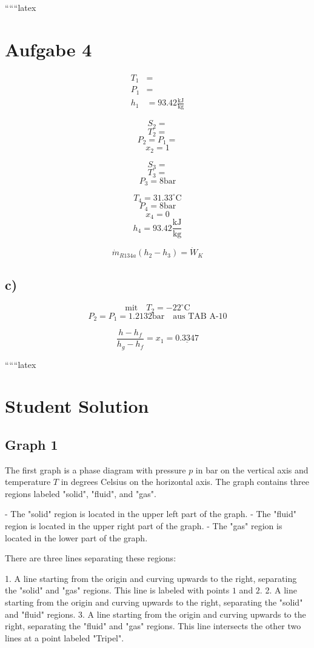 
``````latex


\section*{Aufgabe 4}

\begin{align*}
T_1 &= \\
P_1 &= \\
h_1 &= 93.42 \frac{\text{kJ}}{\text{kg}}
\end{align*}

\[
S_2 = 
\]
\[
T_2 = 
\]
\[
P_2 = P_1 = 
\]
\[
x_2 = 1
\]

\[
S_3 = 
\]
\[
T_3 = 
\]
\[
P_3 = 8 \text{bar}
\]

\[
T_4 = 31.33^\circ \text{C}
\]
\[
P_4 = 8 \text{bar}
\]
\[
x_4 = 0
\]
\[
h_4 = 93.42 \frac{\text{kJ}}{\text{kg}}
\]

\[
\dot{m}_{R134a} (h_2 - h_3) = \dot{W}_K
\]

\subsection*{c)}
\[
\text{mit} \quad T_2 = -22^\circ \text{C}
\]
\[
P_2 = P_1 = 1.2132 \text{bar} \quad \text{aus TAB A-10}
\]

\[
\frac{h - h_f}{h_g - h_f} = x_1 = \underline{0.3347}
\]

``````latex


\section*{Student Solution}

\subsection*{Graph 1}

The first graph is a phase diagram with pressure \( p \) in bar on the vertical axis and temperature \( T \) in degrees Celsius on the horizontal axis. The graph contains three regions labeled "solid", "fluid", and "gas". 

- The "solid" region is located in the upper left part of the graph.
- The "fluid" region is located in the upper right part of the graph.
- The "gas" region is located in the lower part of the graph.

There are three lines separating these regions:

1. A line starting from the origin and curving upwards to the right, separating the "solid" and "gas" regions. This line is labeled with points \( 1 \) and \( 2 \).
2. A line starting from the origin and curving upwards to the right, separating the "solid" and "fluid" regions.
3. A line starting from the origin and curving upwards to the right, separating the "fluid" and "gas" regions. This line intersects the other two lines at a point labeled "Tripel".

